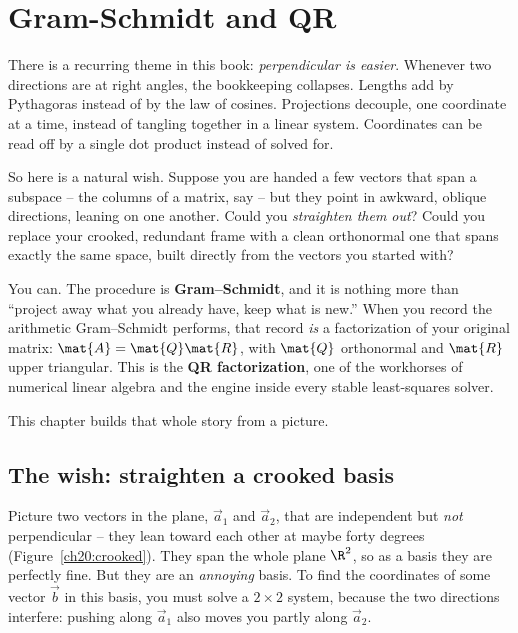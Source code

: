 \chapter{Gram-Schmidt and QR}

There is a recurring theme in this book: \emph{perpendicular is easier}. Whenever
two directions are at right angles, the bookkeeping collapses. Lengths add by
Pythagoras instead of by the law of cosines. Projections decouple, one coordinate
at a time, instead of tangling together in a linear system. Coordinates can be read
off by a single dot product instead of solved for.

So here is a natural wish. Suppose you are handed a few vectors that span a subspace
-- the columns of a matrix, say -- but they point in awkward, oblique directions,
leaning on one another. Could you \emph{straighten them out}? Could you replace your
crooked, redundant frame with a clean orthonormal one that spans exactly the same
space, built directly from the vectors you started with?

You can. The procedure is \textbf{Gram--Schmidt}, and it is nothing more than
``project away what you already have, keep what is new.'' When you record the
arithmetic Gram--Schmidt performs, that record \emph{is} a factorization of your
original matrix: $\mat{A} = \mat{Q}\mat{R}$, with $\mat{Q}$ orthonormal and $\mat{R}$
upper triangular. This is the \textbf{QR factorization}, one of the workhorses of
numerical linear algebra and the engine inside every stable least-squares solver.

This chapter builds that whole story from a picture.

\section{The wish: straighten a crooked basis}

Picture two vectors in the plane, $\vec{a}_1$ and $\vec{a}_2$, that are independent
but \emph{not} perpendicular -- they lean toward each other at maybe forty degrees
(Figure~\ref{ch20:crooked}). They span the whole plane $\R^2$, so as a basis they
are perfectly fine. But they are an \emph{annoying} basis. To find the coordinates of
some vector $\vec{b}$ in this basis, you must solve a $2\times 2$ system, because the
two directions interfere: pushing along $\vec{a}_1$ also moves you partly along
$\vec{a}_2$.

